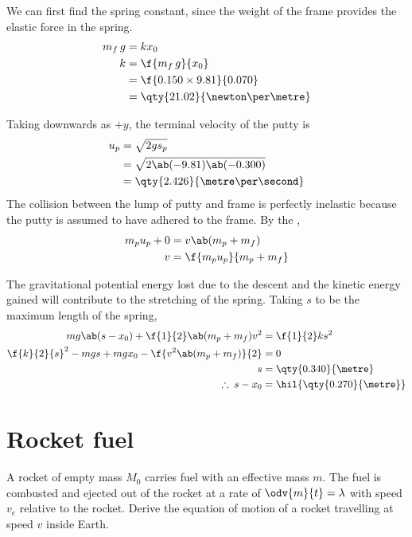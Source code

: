 We can first find the spring constant, since the weight of the frame
provides the elastic force in the spring.
\begin{align*}
	m_f\,{g} & = kx_0                           \\
	k        & = \f{m_f\,{g}}{x_0}              \\
	         & = \f{0.150\times 9.81}{0.070}    \\
	         & = \qty{21.02}{\newton\per\metre}
\end{align*}

Taking downwards as \(+y\), the terminal velocity of the putty is
\begin{align*}
	{u}_p & = \sqrt{2g{s}_p}                 \\
	      & = \sqrt{2\ab(-9.81)\ab(-0.300)}  \\
	      & = \qty{2.426}{\metre\per\second}
\end{align*}
The collision between the lump of putty and frame is perfectly
inelastic because the putty is assumed to
have adhered to the frame. By the ,
\begin{align*}
	m_p{u}_p + 0 & = {v}\ab(m_p + m_f)       \\
	{v}          & = \f{m_p{u}_p}{m_p + m_f}
\end{align*}

The gravitational potential energy lost due to the descent and the
kinetic energy
gained will contribute to the stretching of the spring. Taking \({s}\) to be
the maximum length of the spring,
\begin{align*}
	m{g}\ab({s}-x_0) + \f{1}{2}\ab(m_p + m_f){v}^2 & =
	\f{1}{2}k{s}^2                                                               \\
	\f{k}{2}{s}^2 - m{g}{s} + m{g}x_0 -
	\f{{v}^2\ab(m_p+m_f)}{2}                       & = 0                         \\
	{s}                                            & = \qty{0.340}{\metre}       \\
	\therefore\;{s} - x_0                          & = \hil{\qty{0.270}{\metre}}
\end{align*}

\section{Rocket fuel}
\begin{problem}
A rocket of empty mass \(M_0\) carries fuel with an effective mass \(m\).
The fuel is combusted and ejected out of the rocket at a rate of
\(\odv{m}{t} = \lambda\)
with speed \(v_e\) relative to the rocket. Derive the equation of
motion of a rocket travelling at speed \(v\) inside
Earth.
\end{problem}

